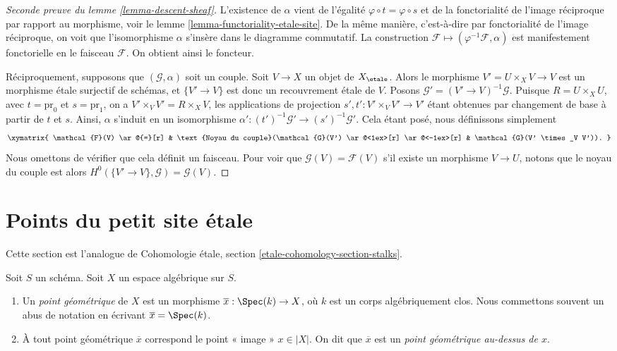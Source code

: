 \begin{proof}[Seconde preuve du lemme \ref{lemma-descent-sheaf}]
L'existence de $\alpha$ vient de l'égalité
$\varphi \circ t = \varphi \circ s$ et de la fonctorialité de l'image réciproque
par rapport au morphisme, voir le
lemme \ref{lemma-functoriality-etale-site}.
De la même manière, c'est-à-dire par fonctorialité de l'image réciproque, on voit
que l'isomorphisme $\alpha$ s'insère dans le diagramme commutatif.
La construction $\mathcal{F} \mapsto (\varphi^{-1}\mathcal{F}, \alpha)$
est manifestement fonctorielle en le faisceau $\mathcal{F}$.
On obtient ainsi le foncteur.

\medskip\noindent
Réciproquement, supposons que $(\mathcal{G}, \alpha)$ soit un couple.
Soit $V \to X$ un objet de $X_\etale$.
Alors le morphisme $V' = U \times_X V \to V$ est un morphisme \'etale surjectif
de schémas, et $\{V' \to V\}$ est donc un recouvrement \'etale
de $V$. Posons $\mathcal{G}' = (V' \to V)^{-1}\mathcal{G}$.
Puisque $R = U \times_X U$, avec $t = \text{pr}_0$
et $s = \text{pr}_1$, on a $V' \times_V V' = R \times_X V$,
les applications de projection $s', t' : V' \times_V V' \to V'$ étant obtenues par changement de base
à partir de $t$ et $s$. Ainsi, $\alpha$ s'induit en un isomorphisme
$\alpha' : (t')^{-1}\mathcal{G}' \to (s')^{-1}\mathcal{G}'$. Cela étant posé,
nous définissons simplement
$$
\xymatrix{
\mathcal{F}(V) \ar@{=}[r] &
\text{Noyau du couple}(\mathcal{G}(V') \ar@<1ex>[r] \ar@<-1ex>[r] &
\mathcal{G}(V' \times_V V')).
}
$$
Nous omettons de vérifier que cela définit un faisceau. Pour voir que
$\mathcal{G}(V) = \mathcal{F}(V)$ s'il existe un morphisme $V \to U$,
notons que le noyau du couple est alors
$H^0(\{V' \to V\}, \mathcal{G}) = \mathcal{G}(V)$.
\end{proof}







\section{Points du petit site \'etale}
\label{section-points-small-etale-site}

\noindent
Cette section est l'analogue de
Cohomologie \'etale, section
\ref{etale-cohomology-section-stalks}.

\begin{definition}
\label{definition-geometric-point}
Soit $S$ un schéma. Soit $X$ un espace algébrique sur $S$.
\begin{enumerate}
\item Un {\it point géométrique} de $X$ est un morphisme
$\overline{x} : \Spec(k) \to X$, où $k$ est un corps algébriquement
clos. Nous commettons souvent un abus de notation en
écrivant $\overline{x} = \Spec(k)$.
\item À tout point géométrique $\overline{x}$ correspond le point
« image » $x \in |X|$. On dit que $\overline{x}$ est un
{\it point géométrique au-dessus de $x$}.
\end{enumerate}
\end{definition}

